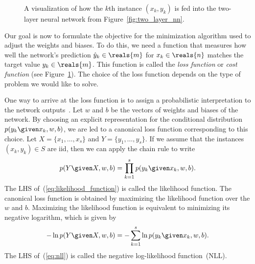 \documentclass[11pt,a4paper]{article}
\numberwithin{equation}{section}
\begin{document}
\begin{figure}
\caption{A visualization of how the $k$th instance $(x_k, y_k)$ is fed into the
two-layer neural network from
Figure~\ref{fig:two_layer_nn}.\label{fig:nn_with_loss}}
\end{figure}

Our goal is now to formulate the objective for the minimization algorithm used
to adjust the weights and biases. To do this, we need a function that measures
how well the network's prediction $\hat{y}_k \in \reals{m}$ for $x_k \in
\reals{n}$ matches the target value $y_k \in \reals{m}$. This function is called
the \emph{loss function} or \emph{cost function} (see
Figure~\ref{fig:nn_with_loss}). The choice of the loss function depends on the
type of problem we would like to solve.

One way to arrive at the loss function is to assign a probabilistic
interpretation to the network outputs~\citep{ml_bishop}. Let $w$ and $b$ be the
vectors of weights and biases of the network. By choosing an explicit
representation for the conditional distribution $p(y_k \given x_k, w, b)$, we
are led to a canonical loss function corresponding to this choice. Let $X =
\{x_1, \ldots, x_s\}$ and $Y = \{y_1, \ldots, y_s\}$. If we assume that the
instances $(x_k, y_k) \in S$ are iid, then we can apply the chain rule to write
\[
	p(Y \given X, w, b) = \prod_{k = 1}^s p(y_k \given x_k, w, b).
	\label{eq:likelihood_function}
\]
The LHS of~(\ref{eq:likelihood_function}) is called the likelihood function. The
canonical loss function is obtained by maximizing the likelihood function over
the $w$ and $b$. Maximizing the likelihood function is equivalent to minimizing
its negative logarithm, which is given by
\begin{equation}
	-\ln{p(Y \given X, w, b)} = -\sum_{k = 1}^s \ln{p(y_k \given x_k, w, b)}.
	\label{eq:nll}
\end{equation}
The LHS of~(\ref{eq:nll}) is called the negative log-likelihood function~(NLL).
\end{document}
